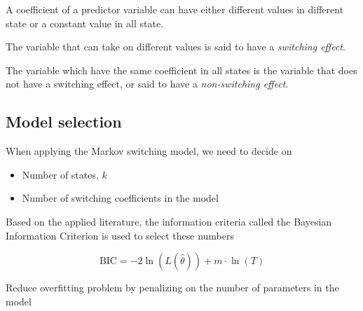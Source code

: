 \documentclass{beamer}
\begin{document}
\begin{frame}
A coefficient of a predictor variable can have either different values in different state or a constant value in all state. 

\vspace{1em}

The variable that can take on different values is said to have a \textit{switching effect}. 

\vspace{1em}

The variable which have the same coefficient in all states is the variable that does not have a switching effect, or said to have a \textit{non-switching effect}. 
\end{frame}

\subsection{Model selection}
\begin{frame}
When applying the Markov switching model, we need to decide on
\begin{itemize}
	\item Number of states, $k$
	\item Number of switching coefficients in the model
\end{itemize}
\vspace{1em}

Based on the applied literature, the information criteria called the Bayesian Information Criterion is used to select these numbers

$$\mathrm{BIC}=-2\ln(L(\hat{\theta}))+m\cdot\ln(T)$$

Reduce overfitting problem by penalizing on the number of parameters in the model

\end{frame}

\end{document}
